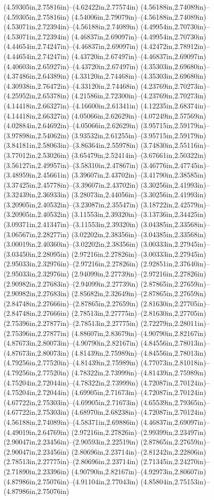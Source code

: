 (4.59305in,2.75816in)--(4.62422in,2.77574in) (4.56188in,2.74089in)--(4.59305in,2.75816in) (4.54006in,2.79079in)--(4.56188in,2.74089in) (4.53071in,2.72394in)--(4.56188in,2.74089in) (4.49954in,2.70730in)--(4.53071in,2.72394in) (4.46837in,2.69097in)--(4.49954in,2.70730in) (4.44654in,2.74247in)--(4.46837in,2.69097in) (4.42472in,2.78912in)--(4.44654in,2.74247in) (4.43720in,2.67497in)--(4.46837in,2.69097in) (4.40603in,2.65927in)--(4.43720in,2.67497in) (4.35303in,2.69680in)--(4.37486in,2.64389in) (4.33120in,2.74468in)--(4.35303in,2.69680in) (4.30938in,2.76472in)--(4.33120in,2.74468in) (4.23769in,2.70273in)--(4.25952in,2.65378in) (4.21586in,2.72300in)--(4.23769in,2.70273in) (4.14418in,2.66327in)--(4.16600in,2.61341in) (4.12235in,2.68374in)--(4.14418in,2.66327in) (4.05066in,2.62629in)--(4.07249in,2.57569in) (4.02884in,2.64692in)--(4.05066in,2.62629in) (3.95715in,2.59179in)--(3.97898in,2.54062in) (3.93532in,2.61255in)--(3.95715in,2.59179in) (3.84181in,2.58063in)--(3.86364in,2.55978in) (3.74830in,2.55116in)--(3.77012in,2.53026in) (3.65479in,2.52414in)--(3.67661in,2.50322in) (3.56127in,2.49957in)--(3.58310in,2.47867in) (3.46776in,2.47745in)--(3.48959in,2.45661in) (3.39607in,2.43702in)--(3.41790in,2.38585in) (3.37425in,2.45778in)--(3.39607in,2.43702in) (3.30256in,2.41993in)--(3.32439in,2.36933in) (3.28073in,2.44056in)--(3.30256in,2.41993in) (3.20905in,2.40532in)--(3.23087in,2.35547in) (3.18722in,2.42579in)--(3.20905in,2.40532in) (3.11553in,2.39320in)--(3.13736in,2.34425in) (3.09371in,2.41347in)--(3.11553in,2.39320in) (3.04385in,2.33568in)--(3.06567in,2.28277in) (3.02202in,2.38356in)--(3.04385in,2.33568in) (3.00019in,2.40360in)--(3.02202in,2.38356in) (3.00333in,2.27945in)--(3.03450in,2.28095in) (2.97216in,2.27826in)--(3.00333in,2.27945in) (2.95033in,2.32976in)--(2.97216in,2.27826in) (2.92851in,2.37640in)--(2.95033in,2.32976in) (2.94099in,2.27739in)--(2.97216in,2.27826in) (2.90982in,2.27683in)--(2.94099in,2.27739in) (2.87865in,2.27659in)--(2.90982in,2.27683in) (2.85682in,2.32649in)--(2.87865in,2.27659in) (2.84748in,2.27666in)--(2.87865in,2.27659in) (2.81630in,2.27705in)--(2.84748in,2.27666in) (2.78513in,2.27775in)--(2.81630in,2.27705in) (2.75396in,2.27877in)--(2.78513in,2.27775in) (2.72279in,2.28011in)--(2.75396in,2.27877in) (4.88607in,2.83679in)--(4.90790in,2.82167in) (4.87673in,2.80073in)--(4.90790in,2.82167in) (4.84556in,2.78013in)--(4.87673in,2.80073in) (4.81439in,2.75989in)--(4.84556in,2.78013in) (4.79256in,2.77520in)--(4.81439in,2.75989in) (4.77073in,2.81018in)--(4.79256in,2.77520in) (4.78322in,2.73999in)--(4.81439in,2.75989in) (4.75204in,2.72044in)--(4.78322in,2.73999in) (4.72087in,2.70124in)--(4.75204in,2.72044in) (4.69905in,2.71673in)--(4.72087in,2.70124in) (4.67722in,2.75303in)--(4.69905in,2.71673in) (4.65539in,2.79365in)--(4.67722in,2.75303in) (4.68970in,2.68238in)--(4.72087in,2.70124in) (4.56188in,2.74089in)--(4.58371in,2.69886in) (4.46837in,2.69097in)--(4.49019in,2.64769in) (2.97216in,2.27826in)--(2.99399in,2.23497in) (2.90047in,2.23456in)--(2.90593in,2.22519in) (2.87865in,2.27659in)--(2.90047in,2.23456in) (2.80696in,2.23714in)--(2.81242in,2.22806in) (2.78513in,2.27775in)--(2.80696in,2.23714in) (2.71345in,2.24270in)--(2.71890in,2.23396in) (4.90790in,2.82167in)--(4.92973in,2.80607in) (4.87986in,2.75076in)--(4.91104in,2.77043in) (4.85804in,2.75153in)--(4.87986in,2.75076in) 